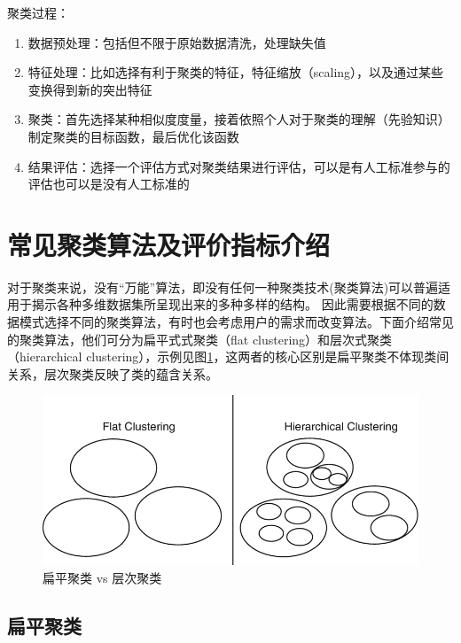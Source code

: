聚类过程：
\begin{enumerate}
    \item 数据预处理：包括但不限于原始数据清洗，处理缺失值 
    \item 特征处理：比如选择有利于聚类的特征，特征缩放（scaling），以及通过某些变换得到新的突出特征
    \item 聚类：首先选择某种相似度度量，接着依照个人对于聚类的理解（先验知识）制定聚类的目标函数，最后优化该函数
    \item 结果评估：选择一个评估方式对聚类结果进行评估，可以是有人工标准参与的评估也可以是没有人工标准的
\end{enumerate} 


\section{常见聚类算法及评价指标介绍}
对于聚类来说，没有“万能”算法，即没有任何一种聚类技术(聚类算法)可以普遍适用于揭示各种多维数据集所呈现出来的多种多样的结构。
因此需要根据不同的数据模式选择不同的聚类算法，有时也会考虑用户的需求而改变算法。下面介绍常见的聚类算法，他们可分为扁平式式聚类（flat clustering）和层次式聚类（hierarchical clustering），示例见图\ref{fig: cluster_taxonomy}，这两者的核心区别是扁平聚类不体现类间关系，层次聚类反映了类的蕴含关系。

\begin{figure}[h]
    \includegraphics[scale=.4]{pic/394318_1_En_9_Fig6_HTML.png}
    \caption{扁平聚类 vs 层次聚类}
    \label{fig: cluster_taxonomy}
\end{figure}

\subsection{扁平聚类}

